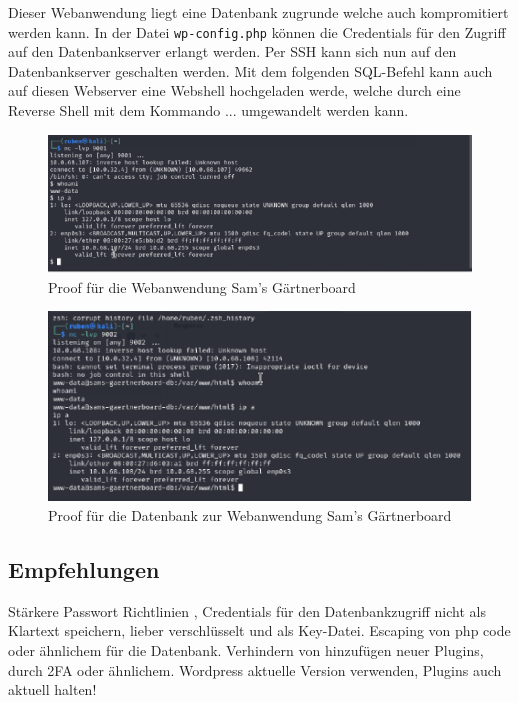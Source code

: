 Dieser Webanwendung liegt eine Datenbank zugrunde welche auch kompromitiert werden kann. In der Datei \texttt{wp-config.php} können die Credentials für den Zugriff auf den Datenbankserver erlangt werden. Per SSH kann sich nun auf den Datenbankserver geschalten werden. Mit dem folgenden SQL-Befehl kann auch auf diesen Webserver eine Webshell hochgeladen werde, welche durch eine Reverse Shell mit dem Kommando ... umgewandelt werden kann.

\begin{figure}[!ht]
    \centering
    \includegraphics[width=\linewidth]{images/proofs/03_sam_proof.png}
    \caption{Proof für die Webanwendung Sam's Gärtnerboard}
    \label{fig:03_sam_proof}
\end{figure}

\begin{figure}[!ht]
    \centering
    \includegraphics[width=\linewidth]{images/proofs/03_sam_db_proof.png}
    \caption{Proof für die Datenbank zur Webanwendung Sam's Gärtnerboard}
    \label{fig:03_sam_db_proof}
\end{figure}

\subsection*{Empfehlungen} Stärkere Passwort Richtlinien \cite{bsi_passwords}, Credentials für den Datenbankzugriff nicht als Klartext speichern, lieber verschlüsselt und als Key-Datei. Escaping von php code oder ähnlichem für die Datenbank. Verhindern von hinzufügen neuer Plugins, durch 2FA oder ähnlichem. Wordpress aktuelle Version verwenden, Plugins auch aktuell halten!


